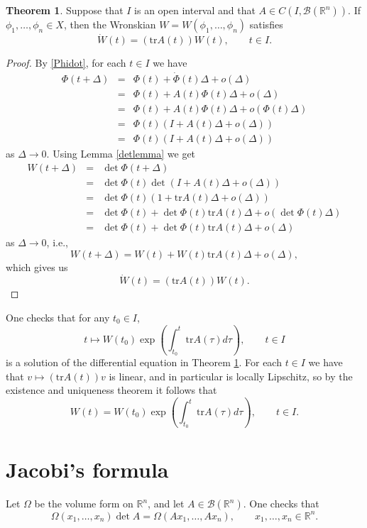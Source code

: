 \documentclass{article}
\newcommand{\tr}{\textrm{tr}}
\theoremstyle{definition}
\newtheorem{theorem}{Theorem}
\begin{document}
\begin{theorem}
Suppose that $I$ is an open interval and that $A \in C(I, \mathscr{B}(\mathbb{R}^n))$.
If $\phi_1,\ldots,\phi_n \in X$,
then the Wronskian $W=W(\phi_1,\ldots,\phi_n)$ satisfies
\[
\dot{W}(t)=(\tr A(t)) W(t) , \qquad t \in I.
\]
\label{abelsformula}
\end{theorem}
\begin{proof}
By \eqref{Phidot}, for each $t \in I$ we have
\begin{eqnarray*}
\Phi(t+\Delta) &=& \Phi(t) + \dot{\Phi}(t) \Delta + o(\Delta)\\
&=&\Phi(t)+A(t)\Phi(t)\Delta + o(\Delta)\\
&=&\Phi(t)+A(t)\Phi(t) \Delta + o(\Phi(t) \Delta)\\
&=&\Phi(t) (I+ A(t) \Delta + o(\Delta))\\
&=&\Phi(t) (I+ A(t) \Delta + o(\Delta) )
\end{eqnarray*}
as $\Delta \to 0$. Using Lemma \ref{detlemma} we get
\begin{eqnarray*}
W(t+\Delta)&=&\det \Phi(t+\Delta)\\
&=&\det \Phi(t) \det (I+A(t)\Delta+o(\Delta))\\
&=&\det \Phi(t)(1+ \tr A(t)  \Delta + o(\Delta))\\
&=&\det \Phi(t) + \det \Phi(t) \tr A(t)\Delta + o\left( \det \Phi(t) \Delta \right)\\
&=&\det \Phi(t) + \det \Phi(t) \tr A(t)\Delta + o(\Delta)
\end{eqnarray*}
as $\Delta \to 0$, i.e.,
\[
W(t+\Delta) = W(t) +W(t) \tr A(t) \Delta + o(\Delta),
\]
which gives us
\[
\dot{W}(t) = (\tr A(t)) W(t).
\]
\end{proof}

One checks that for any $t_0 \in I$, 
\[
t \mapsto W(t_0) \exp\left( \int_{t_0}^t \tr A(\tau) d\tau \right), \qquad t \in I
\]
is a solution of the differential equation in Theorem \ref{abelsformula}. For each $t \in I$ we have that $v \mapsto (\tr A(t))v$ is linear, and in particular
is locally Lipschitz, so by the existence and uniqueness theorem it follows that
\[
W(t) =W(t_0)  \exp\left( \int_{t_0}^t \tr A(\tau) d\tau \right) , \qquad t \in I.
\]



\section{Jacobi's formula}
Let $\Omega$ be the volume form on $\mathbb{R}^n$, and let $A \in \mathscr{B}(\mathbb{R}^n)$.  One checks that
\begin{equation}
\Omega(x_1,\ldots,x_n) \det A = \Omega(Ax_1,\ldots,Ax_n), \qquad x_1,\ldots,x_n \in \mathbb{R}^n.
\label{Adet}
\end{equation}
\end{document}
